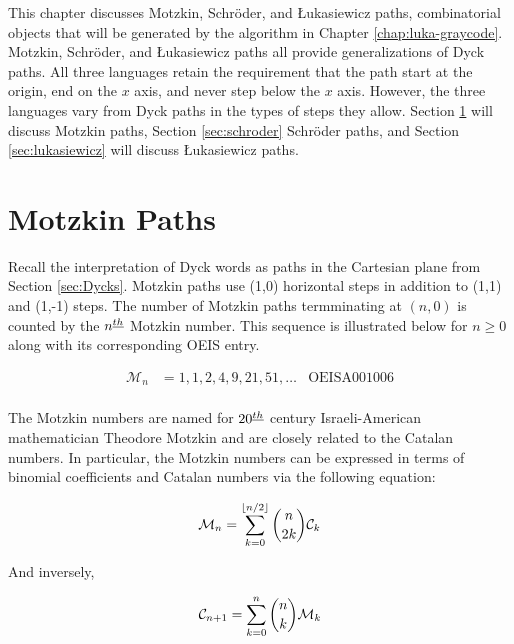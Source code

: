 
This chapter discusses Motzkin, Schröder, and Łukasiewicz paths, combinatorial objects that will be generated by the algorithm in Chapter \ref{chap:luka-graycode}.
Motzkin, Schröder, and Łukasiewicz paths all provide generalizations of Dyck paths.  
All three languages retain the requirement that the path start at the origin, end on the $x$ axis, and never step below the $x$ axis.  However, the three languages vary from Dyck paths in the types of steps they allow.  Section \ref{sec:motzkin} will discuss Motzkin paths, Section \ref{sec:schroder} Schröder paths, and Section \ref{sec:lukasiewicz} will discuss Łukasiewicz paths.

\section{Motzkin Paths}\label{sec:motzkin}
Recall the interpretation of Dyck words as paths in the Cartesian plane from Section \ref{sec:Dycks}.
Motzkin paths use (1,0) horizontal steps in addition to (1,1) and (1,-1) steps. 
The number of Motzkin paths termminating at $(n,0)$ is counted by the $n^{\underline{th}}$ Motzkin number.  This sequence is illustrated below for $n \ge 0$ along with its corresponding OEIS entry.


\begin{align}
\mathcal{M}_n &= 1, 1, 2, 4, 9, 21, 51, \ldots  & \text{OEIS} \text{A}001006 \\
\end{align}

The Motzkin numbers are named for $20^{\underline{th}}$ century Israeli-American mathematician Theodore Motzkin and are closely related to the Catalan numbers.  In particular, the Motzkin numbers can be expressed in terms of binomial coefficients and Catalan numbers via the following equation:

\begin{equation}
	\mathcal{M}_n = \sum_{k=0}^{\lfloor n/2 \rfloor} {n \choose 2k}\mathcal{C}_k
\end{equation}

And inversely, 

\begin{equation}
	\mathcal{C}_{n+1} = \sum_{k=0}^{n} {n \choose k}\mathcal{M}_k
\end{equation}


